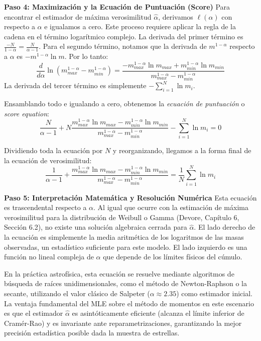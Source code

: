 \textbf{Paso 4: Maximización y la Ecuación de Puntuación (Score)}
Para encontrar el estimador de máxima verosimilitud $\hat{\alpha}$, derivamos $\ell(\alpha)$ con respecto a $\alpha$ e igualamos a cero. Este proceso requiere aplicar la regla de la cadena en el término logarítmico complejo. 
La derivada del primer término es $\frac{-N}{1-\alpha} = \frac{N}{\alpha - 1}$.
Para el segundo término, notamos que la derivada de $m^{1-\alpha}$ respecto a $\alpha$ es $-m^{1-\alpha} \ln m$. Por lo tanto:
$$ \frac{d}{d\alpha} \ln\left(m_{max}^{1-\alpha} - m_{min}^{1-\alpha}\right) = \frac{-m_{max}^{1-\alpha} \ln m_{max} + m_{min}^{1-\alpha} \ln m_{min}}{m_{max}^{1-\alpha} - m_{min}^{1-\alpha}} $$
La derivada del tercer término es simplemente $-\sum_{i=1}^{N} \ln m_i$.

Ensamblando todo e igualando a cero, obtenemos la \textit{ecuación de puntuación} o \textit{score equation}:
$$ \frac{N}{\alpha - 1} + N \frac{m_{max}^{1-\alpha} \ln m_{max} - m_{min}^{1-\alpha} \ln m_{min}}{m_{max}^{1-\alpha} - m_{min}^{1-\alpha}} - \sum_{i=1}^{N} \ln m_i = 0 $$

Dividiendo toda la ecuación por $N$ y reorganizando, llegamos a la forma final de la ecuación de verosimilitud:
$$ \frac{1}{\alpha - 1} + \frac{m_{max}^{1-\alpha} \ln m_{max} - m_{min}^{1-\alpha} \ln m_{min}}{m_{max}^{1-\alpha} - m_{min}^{1-\alpha}} = \frac{1}{N} \sum_{i=1}^{N} \ln m_i $$

\textbf{Paso 5: Interpretación Matemática y Resolución Numérica}
Esta ecuación es trascendental respecto a $\alpha$. Al igual que ocurre con la estimación de máxima verosimilitud para la distribución de Weibull o Gamma (Devore, Capítulo 6, Sección 6.2), no existe una solución algebraica cerrada para $\hat{\alpha}$. El lado derecho de la ecuación es simplemente la media aritmética de los logaritmos de las masas observadas, un estadístico suficiente para este modelo. El lado izquierdo es una función no lineal compleja de $\alpha$ que depende de los límites físicos del cúmulo.

En la práctica astrofísica, esta ecuación se resuelve mediante algoritmos de búsqueda de raíces unidimensionales, como el método de Newton-Raphson o la secante, utilizando el valor clásico de Salpeter ($\alpha \approx 2.35$) como estimador inicial. La ventaja fundamental del MLE sobre el método de momentos en este escenario es que el estimador $\hat{\alpha}$ es asintóticamente eficiente (alcanza el límite inferior de Cramér-Rao) y es invariante ante reparametrizaciones, garantizando la mejor precisión estadística posible dada la muestra de estrellas.

